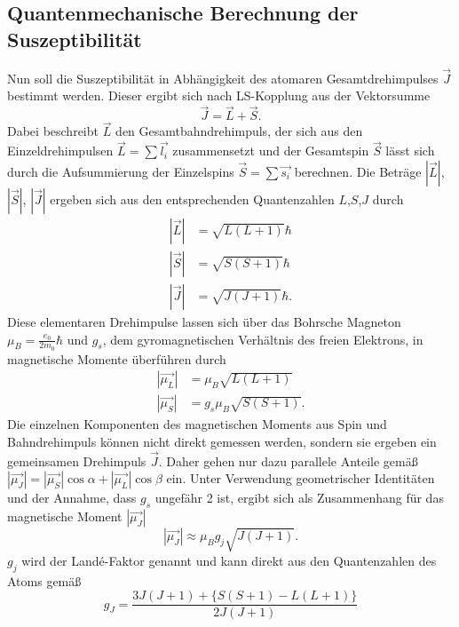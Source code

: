 \subsection{Quantenmechanische Berechnung der Suszeptibilität}
Nun soll die Suszeptibilität in Abhängigkeit des atomaren Gesamtdrehimpulses $\vec{J}$ bestimmt werden.
Dieser ergibt sich nach LS-Kopplung aus der Vektorsumme 
\begin{equation}
    \vec{J}= \vec{L}+\vec{S}.
    \label{eq:LS}
\end{equation}
Dabei beschreibt $\vec{L}$ den Gesamtbahndrehimpuls, der sich aus den Einzeldrehimpulsen $\vec{L}=\sum\vec{l_i}$ zusammensetzt
und der Gesamtspin $\vec{S}$ lässt sich durch die Aufsummierung der Einzelspins $\vec{S}=\sum \vec{s_i}$ berechnen.
Die Beträge $\left|\vec{L}\right|$, $\left|\vec{S}\right|$, $\left|\vec{J}\right|$ ergeben sich aus den
entsprechenden Quantenzahlen $L$,$S$,$J$ durch 
\begin{align}\label{eq:absdreh}
    \left|\vec{L}\right|&=\sqrt{L(L+1)}\hbar\\
    \left|\vec{S}\right|&=\sqrt{S(S+1)}\hbar\\
    \left|\vec{J}\right|&=\sqrt{J(J+1)}\hbar.
\end{align}
Diese elementaren Drehimpulse lassen sich über das Bohrsche Magneton $\mu_B=\frac{e_0}{2m_0}\hbar$ und
$g_s$, dem gyromagnetischen Verhältnis des freien Elektrons, in magnetische Momente überführen durch
\begin{align}\label{eq:absmu}
    \left|\vec{\mu_L}\right|&=\mu_B\sqrt{L(L+1)}\\
    \left|\vec{\mu_S}\right|&=g_s \mu_B\sqrt{S(S+1)}.
\end{align}
Die einzelnen Komponenten des magnetischen Moments aus Spin und Bahndrehimpuls können nicht direkt gemessen werden, sondern
sie ergeben ein gemeinsamen Drehimpuls $\vec{J}$. Daher gehen nur dazu parallele Anteile gemäß
$\left|\vec{\mu_J}\right|=\left|\vec{\mu_S}\right|\cos{\alpha}+\left|\vec{\mu_L}\right|\cos{\beta}$ ein.
Unter Verwendung geometrischer Identitäten und der Annahme, dass $g_s$ ungefähr 2 ist, ergibt sich als Zusammenhang für
das magnetische Moment $\left|\vec{\mu_J}\right|$
\begin{equation}
    \left|\vec{\mu_J}\right| \approx \mu_B g_j \sqrt{J(J+1)}.
    \label{eq:muj}
\end{equation}
$g_j$ wird der Landé-Faktor genannt und kann direkt aus den Quantenzahlen des Atoms gemäß
\begin{equation}
    g_J=\frac{3J(J+1)+\{S(S+1)-L(L+1)\}}{2J(J+1)}
    \label{eq:lande}
\end{equation}
